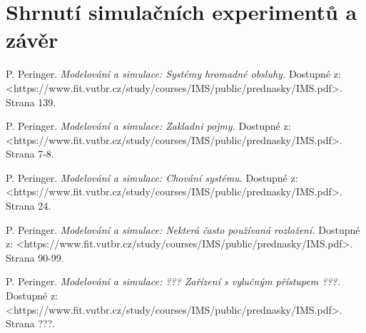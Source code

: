 \documentclass[12pt,a4paper]{article}
\begin{document}
\section{Shrnutí simulačních experimentů a závěr}


\newpage

\begin{thebibliography}{99}

 P. Peringer.
\textit{Modelování a simulace: Systémy hromadné obsluhy.}
Dostupné z: \textless https://www.fit.vutbr.cz/study/courses/IMS/public/prednasky/IMS.pdf\textgreater.
Strana 139.

 P. Peringer.
\textit{Modelování a simulace: Zakladni pojmy.}
Dostupné z: \textless https://www.fit.vutbr.cz/study/courses/IMS/public/prednasky/IMS.pdf\textgreater.
Strana 7-8.

 P. Peringer.
\textit{Modelování a simulace: Chování systému.}
Dostupné z: \textless https://www.fit.vutbr.cz/study/courses/IMS/public/prednasky/IMS.pdf\textgreater.
Strana 24.

 P. Peringer.
\textit{Modelování a simulace: Nekterá často používaná rozložení.}
Dostupné z: \textless https://www.fit.vutbr.cz/study/courses/IMS/public/prednasky/IMS.pdf\textgreater.
Strana 90-99.

 P. Peringer.
\textit{Modelování a simulace: ??? Zařízení s vylučným přístupem ???.}
Dostupné z: \textless https://www.fit.vutbr.cz/study/courses/IMS/public/prednasky/IMS.pdf\textgreater.
Strana ???.


\end{thebibliography}
\end{document}
